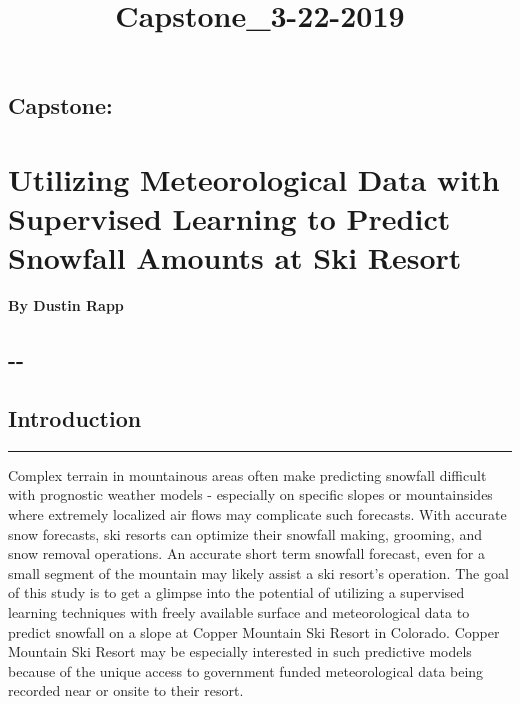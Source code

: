 \documentclass[11pt]{article}
\title{Capstone\_3-22-2019}
\begin{document}
    
    
    \maketitle
    
    

    
    \subsection{Capstone:}\label{capstone}

\section{Utilizing Meteorological Data with Supervised Learning to
Predict Snowfall Amounts at Ski
Resort}\label{utilizing-meteorological-data-with-supervised-learning-to-predict-snowfall-amounts-at-ski-resort}

\textbf{By Dustin Rapp}

\subsection{-\/-}\label{section}

\subsection{Introduction}\label{introduction}

\begin{center}\rule{0.5\linewidth}{\linethickness}\end{center}

Complex terrain in mountainous areas often make predicting snowfall
difficult with prognostic weather models - especially on specific slopes
or mountainsides where extremely localized air flows may complicate such
forecasts. With accurate snow forecasts, ski resorts can optimize their
snowfall making, grooming, and snow removal operations. An accurate
short term snowfall forecast, even for a small segment of the mountain
may likely assist a ski resort's operation. The goal of this study is to
get a glimpse into the potential of utilizing a supervised learning
techniques with freely available surface and meteorological data to
predict snowfall on a slope at Copper Mountain Ski Resort in Colorado.
Copper Mountain Ski Resort may be especially interested in such
predictive models because of the unique access to government funded
meteorological data being recorded near or onsite to their resort.
\end{document}
